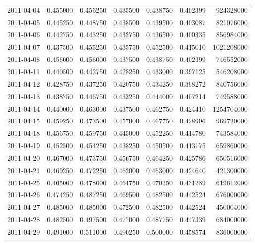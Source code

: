 \begin{tabular}{lrrrrrr}
2011-04-04 &    0.455000 &    0.456250 &    0.435500 &    0.438750 &    0.402399 &   924328000 \\
2011-04-05 &    0.445250 &    0.448750 &    0.438500 &    0.439500 &    0.403087 &   821076000 \\
2011-04-06 &    0.442750 &    0.443250 &    0.432750 &    0.436500 &    0.400335 &   856984000 \\
2011-04-07 &    0.437500 &    0.455250 &    0.435750 &    0.452500 &    0.415010 &  1021208000 \\
2011-04-08 &    0.456000 &    0.456000 &    0.437500 &    0.438750 &    0.402399 &   746552000 \\
2011-04-11 &    0.440500 &    0.442750 &    0.428250 &    0.433000 &    0.397125 &   546208000 \\
2011-04-12 &    0.428750 &    0.437250 &    0.420750 &    0.434250 &    0.398272 &   840756000 \\
2011-04-13 &    0.438750 &    0.446750 &    0.433250 &    0.444000 &    0.407214 &   749588000 \\
2011-04-14 &    0.440000 &    0.463000 &    0.437500 &    0.462750 &    0.424410 &  1254704000 \\
2011-04-15 &    0.459250 &    0.473500 &    0.457000 &    0.467750 &    0.428996 &   969720000 \\
2011-04-18 &    0.456750 &    0.459750 &    0.445000 &    0.452250 &    0.414780 &   743584000 \\
2011-04-19 &    0.452500 &    0.454250 &    0.438250 &    0.450500 &    0.413175 &   659860000 \\
2011-04-20 &    0.467000 &    0.473750 &    0.456750 &    0.464250 &    0.425786 &   650516000 \\
2011-04-21 &    0.469250 &    0.472250 &    0.462000 &    0.463000 &    0.424640 &   421300000 \\
2011-04-25 &    0.465000 &    0.478000 &    0.464750 &    0.470250 &    0.431289 &   619612000 \\
2011-04-26 &    0.474250 &    0.487250 &    0.469500 &    0.482500 &    0.442524 &   676000000 \\
2011-04-27 &    0.485000 &    0.485000 &    0.472500 &    0.482500 &    0.442524 &   450004000 \\
2011-04-28 &    0.482500 &    0.497500 &    0.477000 &    0.487750 &    0.447339 &   684000000 \\
2011-04-29 &    0.491000 &    0.511000 &    0.490250 &    0.500000 &    0.458574 &   836000000 \\

\end{tabular}
